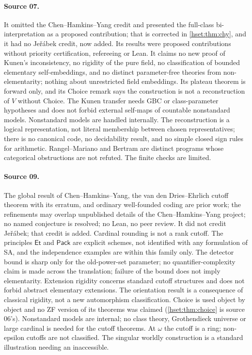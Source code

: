 \documentclass[11pt,letterpaper]{article}
\theoremstyle{definition}
\theoremstyle{remark}
\newcommand{\Et}{\mathsf{Et}}
\newcommand{\Pack}{\mathsf{Pack}}
\begin{document}
\paragraph{Source 07.}
It omitted the Chen--Hamkins--Yang credit and presented the full-class
bi-interpretation as a proposed contribution; that is corrected in
\cref{hset:thm:chy}, and it had no Je\v{r}\'abek credit, now added. Its results
were proposed contributions without priority certification, refereeing or Lean.
It claims no new proof of Kunen's inconsistency, no rigidity of the pure field,
no classification of bounded elementary self-embeddings, and no distinct
parameter-free theories from non-elementarity; nothing about unrestricted field
embeddings. Its plateau theorem is forward only, and its Choice remark says the
construction is not a reconstruction of $V$ without Choice. The Kunen transfer
needs GBC or class-parameter hypotheses and does not forbid external self-maps of
countable nonstandard models. Nonstandard models are handled internally. The
reconstruction is a logical representation, not literal membership between
chosen representatives; there is no canonical code, no decidability result, and
no simple closed sign rules for arithmetic. Rangel--Mariano and Bertram are
distinct programs whose categorical obstructions are not refuted. The finite
checks are limited.

\paragraph{Source 09.}
The global result of Chen--Hamkins--Yang, the van den Dries--Ehrlich cutoff
theorem with its erratum, and ordinary well-founded coding are prior work; the
refinements may overlap unpublished details of the Chen--Hamkins--Yang project;
no named conjecture is resolved; no Lean, no peer review. It did not credit
Je\v{r}\'abek; that credit is added. Cardinal rounding is not a rank cutoff. The
principles $\Et$ and $\Pack$ are explicit schemes, not identified with any
formulation of SA, and the independence examples are within this family only.
The detector bound is sharp only for the old-power-set parameter; no
quantifier-complexity claim is made across the translation; failure of the bound
does not imply elementarity. Extension rigidity concerns standard cutoff
structures and does not forbid abstract elementary extensions. The orientation
result is a consequence of classical rigidity, not a new automorphism
classification. Choice is used object by object and no ZF version of its
theorems was claimed (\cref{hset:thm:choice} is source 06's). Nonstandard models
are internal; no class theory, Grothendieck universe or large cardinal is needed
for the cutoff theorems. At $\omega$ the cutoff is a ring; non-epsilon cutoffs
are not classified. The singular worldly construction is a standard illustration
needing an inaccessible.
\end{document}
